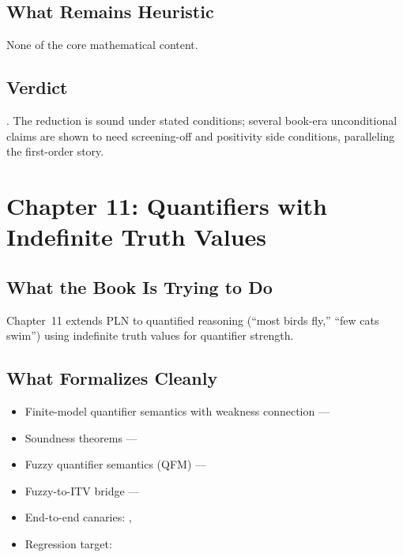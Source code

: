 \documentclass[11pt,openany]{report}
\begin{document}
\section{What Remains Heuristic}

None of the core mathematical content.

\section{Verdict}

\verdictCorrected{}.  The reduction is sound under stated conditions;
several book-era unconditional claims are shown to need screening-off
and positivity side conditions, paralleling the first-order story.


\chapter{Chapter 11: Quantifiers with Indefinite Truth Values}
\label{ch:review-ch11}

\section{What the Book Is Trying to Do}

Chapter~11 extends PLN to quantified reasoning (``most birds fly,''
``few cats swim'') using indefinite truth values for quantifier
strength.

\section{What Formalizes Cleanly}

\begin{itemize}
\item Finite-model quantifier semantics with weakness connection ---
\item Soundness theorems ---
\item Fuzzy quantifier semantics (QFM) ---
\item Fuzzy-to-ITV bridge ---
\item End-to-end canaries:
  ,
\item Regression target:
\end{itemize}
\end{document}
